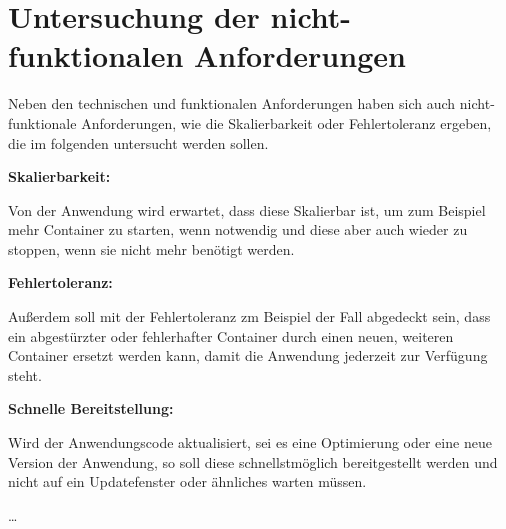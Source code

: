 \section{Untersuchung der nicht-funktionalen Anforderungen}
Neben den technischen und funktionalen Anforderungen haben sich auch nicht-funktionale Anforderungen, wie die Skalierbarkeit oder Fehlertoleranz ergeben, die im folgenden untersucht werden sollen.

\textbf{Skalierbarkeit:}

Von der Anwendung wird erwartet, dass diese Skalierbar ist, um zum Beispiel mehr Container zu starten, wenn notwendig und diese aber auch wieder zu stoppen, wenn sie nicht mehr benötigt werden.

\textbf{Fehlertoleranz:}

Außerdem soll mit der Fehlertoleranz zm Beispiel der Fall abgedeckt sein, dass ein abgestürzter oder fehlerhafter Container durch einen neuen, weiteren Container ersetzt werden kann, damit die Anwendung jederzeit zur Verfügung steht.

\textbf{Schnelle Bereitstellung:}

Wird der Anwendungscode aktualisiert, sei es eine Optimierung oder eine neue Version der Anwendung, so soll diese schnellstmöglich bereitgestellt werden und nicht auf ein Updatefenster oder ähnliches warten müssen.

\dots
\pagebreak